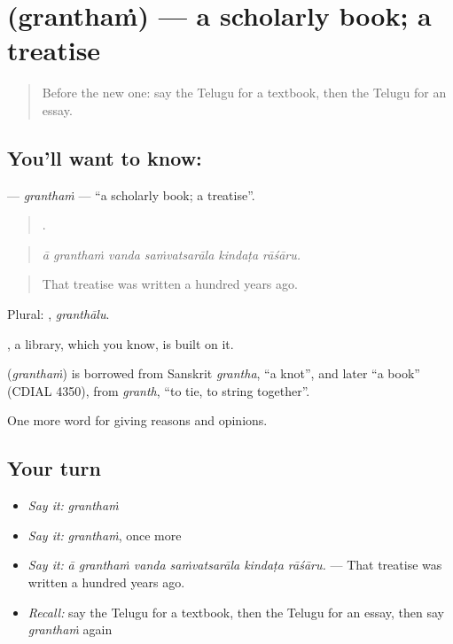 \section[\texorpdfstring{\te{గ్రంథం} (granthaṁ)}{గ్రంథం (granthaṁ)}]{ (granthaṁ) — a scholarly book; a treatise}

\label{lesson:TE-C416-grantham}



\begin{quote}
Before the new one: say the Telugu for a textbook, then the Telugu for an essay.
\end{quote}

\subsection*{You'll want to know: }
\textbf{} — \emph{granthaṁ} — \textquotedblleft{}a scholarly book; a treatise\textquotedblright{}.

\begin{quote}
     .
\end{quote}

\begin{quote}
\emph{ā granthaṁ vanda saṁvatsarāla kindaṭa rāśāru.}
\end{quote}

\begin{quote}
That treatise was written a hundred years ago.
\end{quote}

Plural: , \emph{granthālu}.

, a library, which you know, is built on it.

\begin{cousinweb}
\textbf{} (\emph{granthaṁ}) is borrowed from Sanskrit \emph{grantha}, \textquotedblleft{}a knot\textquotedblright{}, and later \textquotedblleft{}a book\textquotedblright{} (CDIAL 4350), from \emph{granth}, \textquotedblleft{}to tie, to string together\textquotedblright{}.
\end{cousinweb}

\begin{grammarlens}[title={What you've built}]
One more word for giving reasons and opinions.
\end{grammarlens}

\subsection*{Your turn}
\begin{itemize}
\raggedright
  \item \emph{Say it:} \emph{granthaṁ}
  \item \emph{Say it:} \emph{granthaṁ}, once more
  \item \emph{Say it:} \emph{ā granthaṁ vanda saṁvatsarāla kindaṭa rāśāru.} — That treatise was written a hundred years ago.
  \item \emph{Recall:} say the Telugu for a textbook, then the Telugu for an essay, then say \emph{granthaṁ} again
\end{itemize}

